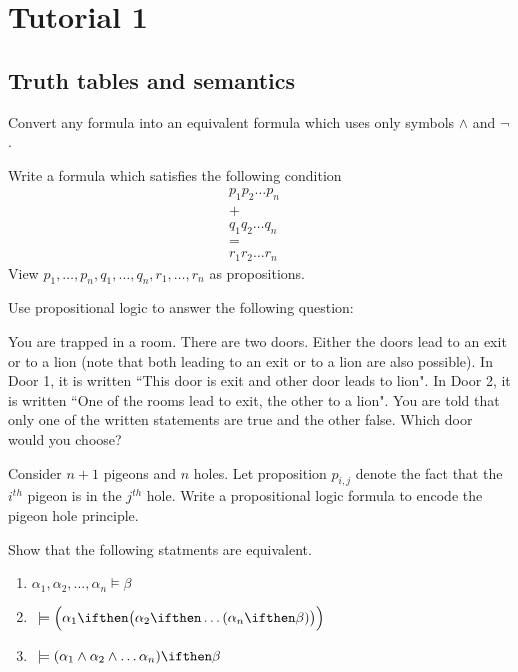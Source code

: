 \chapter*{Tutorial 1}
\section{Truth tables and semantics}

\begin{exercise}
Convert any formula into an equivalent formula which uses only symbols $\wedge$ and $\neg$.
\end{exercise}

\begin{exercise}
Write a formula which satisfies the following condition
\begin{align*}
p_1p_2\dots p_n  \\
+ \\
q_1q_2 \dots q_n &  \\
= \\
r_1r_2 \dots r_n
\end{align*}
View $p_1,\dots,p_n,q_1,\dots,q_n,r_1,\dots,r_n$ as propositions.
\end{exercise}

\begin{exercise}
Use propositional logic to answer the following question:

You are trapped in a room. There are two doors. Either the doors lead to an exit or to a lion (note that both leading to an exit or to a lion are also possible). In Door 1, it is written ``This door is exit and other door leads to lion". In Door 2, it is written ``One of the rooms lead to exit, the other to a lion". You are told that only one of the written statements are true and the other false. Which door would you choose?
\end{exercise}

\begin{exercise}
Consider $n+1$ pigeons and $n$ holes. Let proposition $p_{i,j}$ denote the fact that the $i^{th}$ pigeon is in the $j^{th}$ hole.  Write a propositional logic formula to encode the pigeon hole principle. 
\end{exercise}

\begin{exercise}
Show that the following statments are equivalent.
\begin{enumerate}
\item $\alpha_1,\alpha_2,\dots,\alpha_n \models \beta$
\item \true $~ \models \Big(\alpha_1 \ifthen \big(\alpha_2 \ifthen \dots (\alpha_n \ifthen \beta)\big)\Big)$
\item \true $~\models (\alpha_1 \wedge \alpha_2 \wedge \dots \alpha_n) \ifthen \beta$
\end{enumerate}
\end{exercise}

